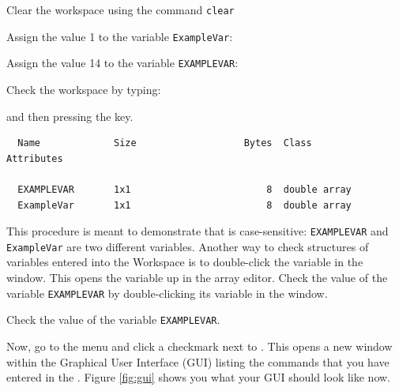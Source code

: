 \begin{action}
Clear the workspace using the command \verb#clear#
\end{action}
\begin{action}
Assign the value 1 to the variable \verb#ExampleVar#:
\end{action} 
\begin{action}
Assign the value 14 to the variable \verb#EXAMPLEVAR#:
\end{action}
\begin{action}
Check the workspace by typing:\\
\end{action}
\noindent and then pressing the  key.
\begin{verbatim}
  Name             Size                   Bytes  Class          Attributes

  EXAMPLEVAR       1x1                        8  double array
  ExampleVar       1x1                        8  double array

\end{verbatim}
This procedure is meant to demonstrate that \MATLAB{} is case-sensitive: \verb#EXAMPLEVAR# and \verb#ExampleVar# are two different variables. Another way to check structures of variables entered into the \MATLAB{} Workspace is to double-click the variable in the \MATLAB{}  window. This opens the variable up in the array editor. Check the value of the variable \verb#EXAMPLEVAR# by double-clicking its variable in the  window.
\begin{action}
Check the value of the variable \verb#EXAMPLEVAR#.
\end{action}



\begin{action}
Now, go to the  menu and click a checkmark next to . This opens a new window within the \MATLAB{} Graphical User Interface (GUI) listing the commands that you have entered in the . Figure \ref{fig:gui} shows you what your GUI should look like now. 
\end{action}


